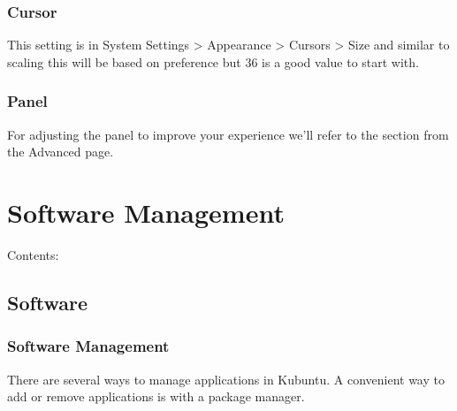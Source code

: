 \documentclass[letterpaper,10pt,english]{sphinxmanual}
\begin{document}


\subsection{Cursor}
\label{\detokenize{docs/desktop-guide/hidpi:cursor}}
\sphinxAtStartPar
This setting is in System Settings \sphinxhyphen{}\textgreater{} Appearance \sphinxhyphen{}\textgreater{} Cursors \sphinxhyphen{}\textgreater{} Size and similar to scaling this will be based on preference but 36 is a good value to start with.



\subsection{Panel}
\label{\detokenize{docs/desktop-guide/hidpi:panel}}
\sphinxAtStartPar
For adjusting the panel to improve your experience we’ll refer to the {\hyperref[\detokenize{docs/desktop-guide/advanced:panel}]{}} section from the Advanced page.


\chapter{Software Management}
\label{\detokenize{docs/software-management/software-list:software-management}}\label{\detokenize{docs/software-management/software-list::doc}}
\sphinxAtStartPar
Contents:


\section{Software}
\label{\detokenize{docs/software-management/software:software}}\label{\detokenize{docs/software-management/software:software-link}}\label{\detokenize{docs/software-management/software::doc}}

\subsection{Software Management}
\label{\detokenize{docs/software-management/software:software-management}}
\sphinxAtStartPar
There are several ways to manage applications in Kubuntu. A convenient way to add or remove applications is with a package manager.
\end{document}
